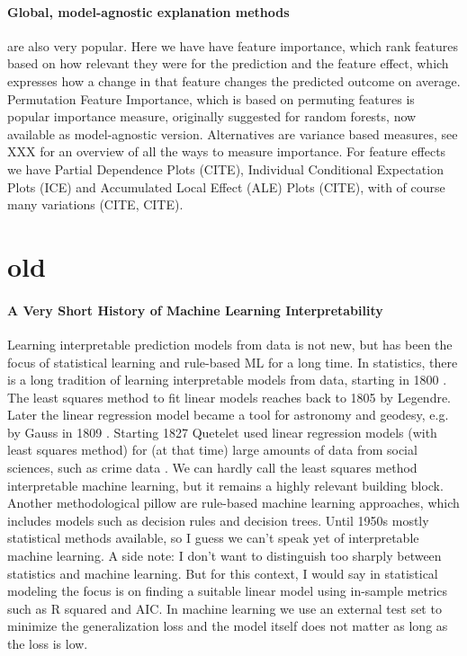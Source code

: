 \documentclass[runningheads]{llncs}
\begin{document}
\paragraph{Global, model-agnostic explanation methods} are also very popular.
Here we have have feature importance, which rank features based on how relevant they were for the prediction and the feature effect, which expresses how a change in that feature changes the predicted outcome on average.
Permutation Feature Importance, which is based on permuting features is popular importance measure, originally suggested for random forests, now available as model-agnostic version.
Alternatives are variance based measures, see XXX for an overview of all the ways to measure importance.
For feature effects we have Partial Dependence Plots (CITE), Individual Conditional Expectation Plots (ICE) and Accumulated Local Effect (ALE) Plots (CITE), with of course many variations (CITE, CITE).





\section{old}


\paragraph{A Very Short History of Machine Learning Interpretability}
Learning interpretable prediction models from data is not new, but has been the focus of statistical learning and rule-based ML for a long time.
In statistics, there is a long tradition of learning interpretable models from data, starting in 1800 \cite{stigler1986history}.
The least squares  method to fit linear models reaches back to 1805 by Legendre. \cite{legendre1805nouvelles}
Later the linear regression model became a tool for astronomy and geodesy, e.g. by Gauss in 1809 \cite{gauss1809theoria}.
Starting 1827 Quetelet used linear regression models (with least squares method) for (at that time) large amounts of data from social sciences, such as crime data \cite{quetelet1827recherches}.
We can hardly call the least squares method interpretable machine learning, but it remains a highly relevant building block.
Another methodological pillow are rule-based machine learning approaches, which includes models such as decision rules and decision trees.
Until 1950s mostly statistical methods available, so I guess we can't speak yet of interpretable machine learning.
A side note: I don't want to distinguish too sharply between statistics and machine learning.
But for this context, I would say in statistical modeling the focus is on finding a suitable linear model using in-sample metrics such as R squared and AIC.
In machine learning we use an external test set to minimize the generalization loss and the model itself does not matter as long as the loss is low.
\end{document}
